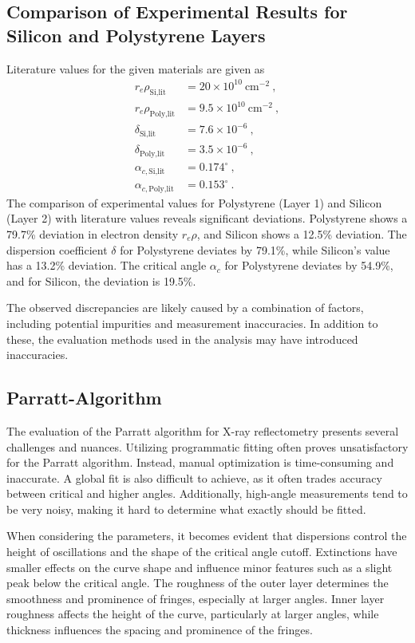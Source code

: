 \subsection{Comparison of Experimental Results for Silicon and Polystyrene Layers}
Literature values for the given materials are given as 
\begin{align*}
    r_e \rho_{\text{Si,lit}} &= 20 \times 10^{10} \: \text{cm}^{-2} \: , \\
    r_e \rho_{\text{Poly,lit}} &= 9.5 \times 10^{10} \: \text{cm}^{-2} \: , \\
    \delta_{\text{Si,lit}} &= 7.6 \times 10^{-6} \: , \\
    \delta_{\text{Poly,lit}} &= 3.5 \times 10^{-6} \: , \\
    \alpha_{c,\text{Si,lit}} &= 0.174^\circ \: , \\
    \alpha_{c,\text{Poly,lit}} &= 0.153^\circ \: . %
\end{align*}
The comparison of experimental values for Polystyrene (Layer 1) and Silicon (Layer 2) with literature values reveals significant deviations. Polystyrene shows a 79.7\% deviation in electron density \( r_e \rho \), and Silicon shows a 12.5\% deviation. The dispersion coefficient \( \delta \) for Polystyrene deviates by 79.1\%, while Silicon's value has a 13.2\% deviation. The critical angle \( \alpha_c \) for Polystyrene deviates by 54.9\%, and for Silicon, the deviation is 19.5\%.


The observed discrepancies are likely caused by a combination of factors, including potential impurities and measurement inaccuracies. In addition to these, the evaluation methods used in the analysis may have introduced inaccuracies.


\subsection{Parratt-Algorithm}

The evaluation of the Parratt algorithm for X-ray reflectometry presents several challenges and nuances. Utilizing programmatic fitting often proves unsatisfactory for the Parratt algorithm. Instead, manual optimization is time-consuming and inaccurate. A global fit is also difficult to achieve, as it often trades accuracy between critical and higher angles. Additionally, high-angle measurements tend to be very noisy, making it hard to determine what exactly should be fitted.

When considering the parameters, it becomes evident that dispersions control the height of oscillations and the shape of the critical angle cutoff. Extinctions have smaller effects on the curve shape and influence minor features such as a slight peak below the critical angle. The roughness of the outer layer determines the smoothness and prominence of fringes, especially at larger angles. Inner layer roughness affects the height of the curve, particularly at larger angles, while thickness influences the spacing and prominence of the fringes.

